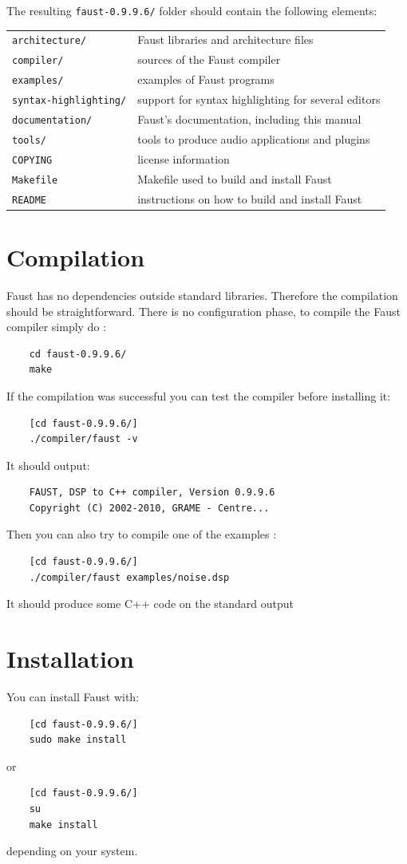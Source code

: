 \documentclass[a4paper]{book}
\begin{document}
The resulting  \lstinline'faust-0.9.9.6/' folder should contain the following elements:

\begin{tabular}{ll}
	\lstinline'architecture/' 		&Faust libraries and architecture files\\
	\lstinline'compiler/'			&sources of the Faust compiler\\
	\lstinline'examples/'			&examples of Faust programs\\
	\lstinline'syntax-highlighting/'&	support for syntax highlighting for several editors\\
	\lstinline'documentation/' 		&Faust's documentation, including this manual\\
	\lstinline'tools/'				&tools to produce audio applications and plugins\\
	\lstinline'COPYING'				&license information\\
	\lstinline'Makefile'			&Makefile used to build and install Faust\\
	\lstinline'README'				&instructions on how to build and install Faust
\end{tabular}

\section{Compilation}
Faust has no dependencies outside standard libraries. Therefore the compilation should be straightforward. There is no configuration phase, to compile the Faust compiler simply do :
\begin{lstlisting}
	cd faust-0.9.9.6/
	make
\end{lstlisting}

If the compilation was successful you can test the compiler before installing it:
\begin{lstlisting}
	[cd faust-0.9.9.6/]
	./compiler/faust -v
\end{lstlisting}
It should output:
\begin{lstlisting}
	FAUST, DSP to C++ compiler, Version 0.9.9.6
	Copyright (C) 2002-2010, GRAME - Centre... 
\end{lstlisting}

Then you can also try to compile one of the examples :
\begin{lstlisting}
	[cd faust-0.9.9.6/]
	./compiler/faust examples/noise.dsp
\end{lstlisting}
It should produce some C++ code on the standard output

\section{Installation}
You can install Faust with:
\begin{lstlisting}
	[cd faust-0.9.9.6/]
	sudo make install
\end{lstlisting}
or
\begin{lstlisting}
	[cd faust-0.9.9.6/]
	su
	make install
\end{lstlisting}
depending on your system.
\end{document}
